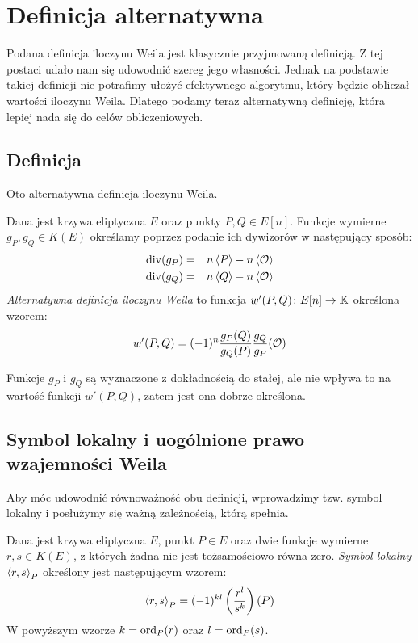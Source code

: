 \section{Definicja alternatywna}

Podana definicja iloczynu Weila jest klasycznie przyjmowaną definicją.
Z tej postaci udało nam się udowodnić szereg jego własności.
Jednak na podstawie takiej definicji nie potrafimy
ułożyć efektywnego algorytmu,
który będzie obliczał wartości iloczynu Weila.
Dlatego podamy teraz alternatywną definicję,
która lepiej nada się do celów obliczeniowych.

\subsection*{Definicja}

Oto alternatywna definicja iloczynu Weila.

\begin{definition}
Dana jest krzywa eliptyczna $E$ oraz punkty $P, Q \in E[n]$.
Funkcje wymierne $g_P, g_Q \in K(E)$
określamy poprzez podanie ich dywizorów
w następujący sposób:
\begin{eqnarray*}
\operatorname{div}(g_P) & = & n\left\langle P\right\rangle - n\left\langle\mathcal{O}\right\rangle \\
\operatorname{div}(g_Q) & = & n\left\langle Q\right\rangle - n\left\langle\mathcal{O}\right\rangle
\end{eqnarray*}
\emph{Alternatywna definicja iloczynu Weila}
to funkcja $w'(P, Q)\colon E[n] \to \mathbb{K}$
określona wzorem:
\begin{equation}
w'(P, Q) = (-1)^n\frac{g_P(Q)}{g_Q(P)}\frac{g_Q}{g_P}(\mathcal{O})
\end{equation}
\end{definition}

\begin{remark}
Funkcje $g_P$ i $g_Q$ są wyznaczone z dokładnością do stałej,
ale nie wpływa to na wartość funkcji $w'(P, Q)$,
zatem jest ona dobrze określona.
\end{remark}

\subsection*{Symbol lokalny i uogólnione prawo wzajemności Weila}

Aby móc udowodnić równoważność obu definicji,
wprowadzimy tzw. symbol lokalny
i posłużymy się ważną zależnością, którą spełnia.

\begin{definition}
Dana jest krzywa eliptyczna $E$, punkt $P \in E$
oraz dwie funkcje wymierne $r, s \in K(E)$,
z których żadna nie jest tożsamościowo równa zero.
\emph{Symbol lokalny $\left\langle r , s \right\rangle_{P}$}
określony jest następującym wzorem:
\begin{equation}
\left\langle r , s \right\rangle_{P} = (-1)^{kl}\left(\frac{r^l}{s^k}\right)(P)
\end{equation}
W powyższym wzorze $k = \operatorname{ord}_P(r)$ oraz $l = \operatorname{ord}_P(s)$.
\end{definition}

